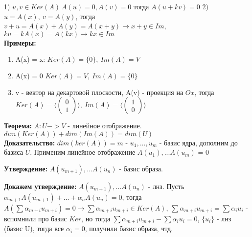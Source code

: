 \documentclass[12pt]{article}
\begin{document}
  1) $u, v \in Ker(A) \ A(u) = 0, A(v) = 0$ тогда $A(u + kv) = 0$
  2) $u = A(x),\ v = A(y)$, тогда $v + u = A(x) + A(y) = A(x + y) \rightarrow x + y \in Im$, $ku = kA(x) = A(kx) \rightarrow kx \in Im$
\\
\textbf{Примеры:} \begin{enumerate}
    \item A(x) = x: $Ker(A) = \{0\},\ Im(A) = V$
    \item A(x) = 0 $Ker(A) = V,\ Im(A) = \{0\}$
    \item v - вектор на декартовой плоскости, A(v) - проекция на $Ox$, тогда $Ker(A) = \langle \begin{pmatrix}
        0 \\
        1
    \end{pmatrix} \rangle,\ Im(A) = \langle \begin{pmatrix}
        1 \\
        0
    \end{pmatrix} \rangle$
\end{enumerate}
  \textbf{Теорема:} $A: U -> V$ - линейное отображение. $dim(Ker(A))+ dim(Im(A)) = dim(U)$
\\
  \textbf{Доказательство:} $dim(ker(A)) = m$ - $u_1, ..., u_m$ - базис ядра, дополним до базиса $U$. Применим линейное отображение $A(u_1), ... A(u_m)$ = 0
  
  \textbf{Утверждение:} $A(u_{m+1}), ... A(u_{n})$ - базис образа.
  
  \textbf{Докажем утверждение:} $A(u_{m+1}), ... A(u_{n})$ - лнз.
  Пусть $\alpha_{m + 1} A(u_{m + 1}) + ... + \alpha_{n} A(u_{n}) = 0$, тогда $A(\sum {\alpha_{m + i}u_{m + i}}) = 0 \rightarrow \sum {\alpha_{m + i}u_{m + i}} \in Ker(A)$, $\sum {\alpha_{m + i}u_{m + i}} = \sum {\alpha_{i}u_{i}}$ - вспомнили про базис $Ker$, но тогда $\sum {\alpha_{m + i}u_{m + i}} - \sum {\alpha_{i}u_{i}} = 0$, $\{u_i\}$ - лнз (базис U), тогда все $\alpha_i = 0$, получили базис образа, чтд.
\end{document}
